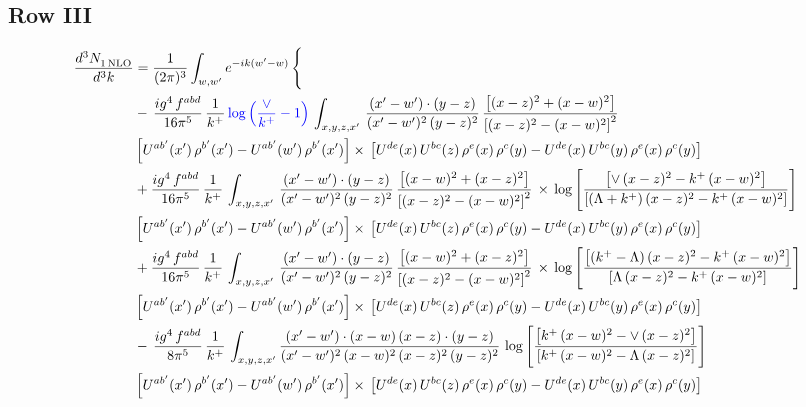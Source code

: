 \documentclass[9pt]{article}
\numberwithin{equation}{section}
\begin{document}
\subsection{Row III}
\begin{align}
   \frac{d^{3}N_{1\,\rm NLO}^{\rm}}{d^{3}k}  & = \frac{1}{(2\pi)^{3}}  \int_{w, w^\prime} e^{-ik(w^\prime-w)}\, \Bigg\{\notag \\ & -\,\frac{ig^{4}\,f^{abd}}{16\pi^{5}}\,\frac{1}{k^{+}}\,{\color{blue} \log{\left(\frac{\vee}{k^{+}}-1\right)}}\,\int_{x,y,z,x'}\, \frac{(x'-w')\cdot (y-z)}{(x'-w')^{2}\,(y-z)^{2}}\,\frac{\left[(x-z)^{2}+(x-w)^{2}\right]}{\left[(x-z)^{2}-(x-w)^{2}\right]^{2}}\notag \\ & \left[U^{ab'}(x')\,\rho^{b'}(x')-U^{ab'}(w')\, \rho^{b'}(x')\right]\times\, \left[U^{de}(x)\,U^{bc}(z)\, \rho^{e}(x)\,\rho^{c}(y)-U^{de}(x)\,U^{bc}(y)\,\rho^{e}(x)\,\rho^{c}(y)\right]\notag \\ &  +\frac{ig^{4}\,f^{abd}}{16\pi^{5}}\, \frac{1}{k^{+}}\,\int_{x,y,z,x'}\, \frac{(x'-w')\cdot (y-z)}{(x'-w')^{2}\,(y-z)^{2}}\, \frac{\left[(x-w)^{2}+(x-z)^{2}\right]}{\left[(x-z)^{2}-(x-w)^{2}\right]^{2}}\, \times\, \log{\left[\frac{\left[\vee\, (x-z)^{2} - k^{+}\, (x-w)^{2}\right]}{\left[(\Lambda + k^{+})\, (x-z)^{2} - k^{+}\, (x-w)^{2}\right]}\right]}\notag \\ & \left[U^{ab'}(x')\,\rho^{b'}(x')-U^{ab'}(w')\, \rho^{b'}(x')\right]\times\, \left[U^{de}(x)\,U^{bc}(z)\, \rho^{e}(x)\,\rho^{c}(y)-U^{de}(x)\,U^{bc}(y)\,\rho^{e}(x)\,\rho^{c}(y)\right]\notag \\ &   +\frac{ig^{4}\,f^{abd}}{16\pi^{5}}\, \frac{1}{k^{+}}\,\int_{x,y,z,x'}\, \frac{(x'-w')\cdot (y-z)}{(x'-w')^{2}\,(y-z)^{2}}\, \frac{\left[(x-w)^{2}+(x-z)^{2}\right]}{\left[(x-z)^{2}-(x-w)^{2}\right]^{2}}\, \times\, \log{\left[\frac{\left[(k^{+}-\Lambda)\, (x-z)^{2} - k^{+}\, (x-w)^{2}\right]}{\left[\Lambda\, (x-z)^{2} - k^{+}\, (x-w)^{2}\right]}\right]}\notag \\ & \left[U^{ab'}(x')\,\rho^{b'}(x')-U^{ab'}(w')\, \rho^{b'}(x')\right]\times\, \left[U^{de}(x)\,U^{bc}(z)\, \rho^{e}(x)\,\rho^{c}(y)-U^{de}(x)\,U^{bc}(y)\,\rho^{e}(x)\,\rho^{c}(y)\right]\notag \\ & -\, \frac{ig^{4}\,f^{abd}}{8\pi^{5}}\,\frac{1}{k^{+}}\,\int_{x,y,z,x'}\frac{(x'-w')\cdot (x-w)\, (x-z)\cdot (y-z)}{(x'-w')^{2}\, (x-w)^{2}\, (x-z)^{2}\, (y-z)^{2}}\,\log{\left[\frac{\left[k^{+}\,(x-w)^{2}-\vee\, (x-z)^{2}\right]}{\left[k^{+}\,(x-w)^{2}-\Lambda\, (x-z)^{2}\right]}\right]} \notag \\ & \left[U^{ab'}(x')\,\rho^{b'}(x')-U^{ab'}(w')\, \rho^{b'}(x')\right]\times\, \left[U^{de}(x)\,U^{bc}(z)\, \rho^{e}(x)\,\rho^{c}(y)-U^{de}(x)\,U^{bc}(y)\,\rho^{e}(x)\,\rho^{c}(y)\right]
\end{align}
\end{document}
